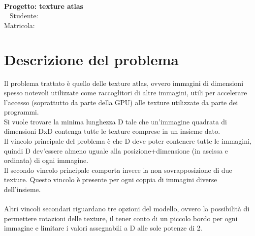 

\begin{center}
	\hspace{0pt}
	\vfill
	\Huge{
		\textbf{\thetitle} \\
		\LARGE{\textbf{Progetto: texture atlas}} \\
		\ \newline \newline \newline
		\Large{	Studente: \textbf{\theauthor} } \\
		\normalsize{{Matricola: \textbf{\matNum}} }
	}
	\vfill
	\hspace{0pt}
\end{center}
\newpage




\tableofcontents    
\newpage





\section{Descrizione del problema}



Il problema trattato è quello delle texture atlas, ovvero immagini di dimensioni spesso notevoli utilizzate come raccoglitori di altre immagini, utili per accelerare l’accesso (soprattutto da parte della GPU) alle texture utilizzate da parte dei programmi. \\
Si vuole trovare la minima lunghezza D tale che un’immagine quadrata di dimensioni DxD contenga tutte le texture comprese in un insieme dato. \\
Il vincolo principale del problema è che D deve poter contenere tutte le immagini, quindi D dev’essere almeno uguale alla posizione+dimensione (in ascissa e ordinata) di ogni immagine. \\
Il secondo vincolo principale comporta invece la non sovrapposizione di due texture. Questo vincolo è presente per ogni coppia di immagini diverse dell’insieme. \\
\ \\
Altri vincoli secondari riguardano tre opzioni del modello, ovvero la possibilità di permettere rotazioni delle texture, il tener conto di un piccolo bordo per ogni immagine e limitare i valori assegnabili a D alle sole potenze di 2.


\newpage

